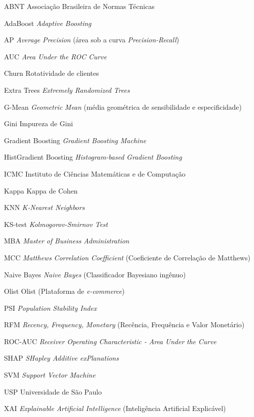 \begingroup
\sloppy %
\begin{siglas}
	\setlength{\itemsep}{0pt}
	\item[ABNT] Associação Brasileira de Normas Técnicas
	\item[AdaBoost] \textit{Adaptive Boosting}
	\item[AP] \textit{Average Precision} (área sob a curva \textit{Precision-Recall})
	\item[AUC] \textit{Area Under the ROC Curve}
	\item[Churn] Rotatividade de clientes
	\item[Extra Trees] \textit{Extremely Randomized Trees}
	\item[G-Mean] \textit{Geometric Mean} (média geométrica de sensibilidade e especificidade)
	\item[Gini] Impureza de Gini
	\item[Gradient Boosting] \textit{Gradient Boosting Machine}
	\item[HistGradient Boosting] \textit{Histogram-based Gradient Boosting}
	\item[ICMC] Instituto de Ciências Matemáticas e de Computação
	\item[Kappa] Kappa de Cohen
	\item[KNN] \textit{K-Nearest Neighbors}
	\item[KS-test] \textit{Kolmogorov-Smirnov Test}
	\item[MBA] \textit{Master of Business Administration}
	\item[MCC] \textit{Matthews Correlation Coefficient} (Coeficiente de Correlação de Matthews)
	\item[Naive Bayes] \textit{Naive Bayes} (Classificador Bayesiano ingênuo)
	\item[Olist] Olist (Plataforma de \textit{e-commerce})
	\item[PSI] \textit{Population Stability Index}
	\item[RFM] \textit{Recency, Frequency, Monetary} (Recência, Frequência e Valor Monetário)
	\item[ROC-AUC] \textit{Receiver Operating Characteristic - Area Under the Curve}
	\item[SHAP] \textit{SHapley Additive exPlanations}
	\item[SVM] \textit{Support Vector Machine}
	\item[USP] Universidade de São Paulo
	\item[XAI] \textit{Explainable Artificial Intelligence} (Inteligência Artificial Explicável)
\end{siglas}
\endgroup

